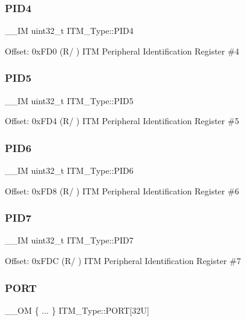 \subsubsection{\texorpdfstring{PID4}{PID4}}
{\footnotesize\ttfamily \+\_\+\+\_\+\+IM uint32\+\_\+t I\+T\+M\+\_\+\+Type\+::\+P\+I\+D4}

Offset\+: 0x\+F\+D0 (R/ ) I\+TM Peripheral Identification Register \#4 \mbox{\label{struct_i_t_m___type_af9085648bf18f69b5f9d1136d45e1d37}} 
\subsubsection{\texorpdfstring{PID5}{PID5}}
{\footnotesize\ttfamily \+\_\+\+\_\+\+IM uint32\+\_\+t I\+T\+M\+\_\+\+Type\+::\+P\+I\+D5}

Offset\+: 0x\+F\+D4 (R/ ) I\+TM Peripheral Identification Register \#5 \mbox{\label{struct_i_t_m___type_ad34dbe6b1072c77d36281049c8b169f6}} 
\subsubsection{\texorpdfstring{PID6}{PID6}}
{\footnotesize\ttfamily \+\_\+\+\_\+\+IM uint32\+\_\+t I\+T\+M\+\_\+\+Type\+::\+P\+I\+D6}

Offset\+: 0x\+F\+D8 (R/ ) I\+TM Peripheral Identification Register \#6 \mbox{\label{struct_i_t_m___type_a2bcec6803f28f30d5baf5e20e3517d3d}} 
\subsubsection{\texorpdfstring{PID7}{PID7}}
{\footnotesize\ttfamily \+\_\+\+\_\+\+IM uint32\+\_\+t I\+T\+M\+\_\+\+Type\+::\+P\+I\+D7}

Offset\+: 0x\+F\+DC (R/ ) I\+TM Peripheral Identification Register \#7 \mbox{\label{struct_i_t_m___type_a3bf05bf08f89c7cd5b44a333585b19f0}} 
\subsubsection{\texorpdfstring{PORT}{PORT}\hspace{0.1cm}{\footnotesize\ttfamily [1/6]}}
{\footnotesize\ttfamily \+\_\+\+\_\+\+OM \{ ... \}    I\+T\+M\+\_\+\+Type\+::\+P\+O\+RT\mbox{[}32\+U\mbox{]}}

